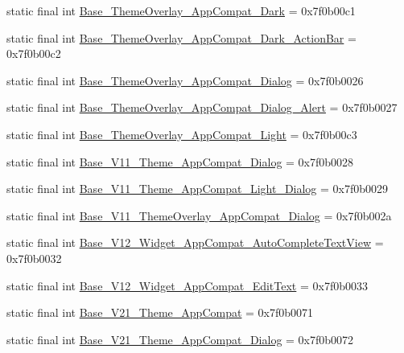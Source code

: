 \begin{CompactItemize}
static final int \hyperlink{classandroid_1_1support_1_1v7_1_1recyclerview_1_1_r_1_1style_ff69ab507a86cc9e91f1a405a536463d}{Base\_\-ThemeOverlay\_\-AppCompat\_\-Dark} = 0x7f0b00c1
\item 
static final int \hyperlink{classandroid_1_1support_1_1v7_1_1recyclerview_1_1_r_1_1style_516b93e3d4a6ddb150d06a687717e23c}{Base\_\-ThemeOverlay\_\-AppCompat\_\-Dark\_\-ActionBar} = 0x7f0b00c2
\item 
static final int \hyperlink{classandroid_1_1support_1_1v7_1_1recyclerview_1_1_r_1_1style_e09d7a0fd144cad835358474a1c50645}{Base\_\-ThemeOverlay\_\-AppCompat\_\-Dialog} = 0x7f0b0026
\item 
static final int \hyperlink{classandroid_1_1support_1_1v7_1_1recyclerview_1_1_r_1_1style_e2aaf58f5a0c47b619f72d6a9a72d1e9}{Base\_\-ThemeOverlay\_\-AppCompat\_\-Dialog\_\-Alert} = 0x7f0b0027
\item 
static final int \hyperlink{classandroid_1_1support_1_1v7_1_1recyclerview_1_1_r_1_1style_e5a5e01a3546756c36eadf0b0498929c}{Base\_\-ThemeOverlay\_\-AppCompat\_\-Light} = 0x7f0b00c3
\item 
static final int \hyperlink{classandroid_1_1support_1_1v7_1_1recyclerview_1_1_r_1_1style_81003bb3fdd3ed5c25e4a3146ad454bf}{Base\_\-V11\_\-Theme\_\-AppCompat\_\-Dialog} = 0x7f0b0028
\item 
static final int \hyperlink{classandroid_1_1support_1_1v7_1_1recyclerview_1_1_r_1_1style_d7ef20e388af9c35729f0f6595ba9f69}{Base\_\-V11\_\-Theme\_\-AppCompat\_\-Light\_\-Dialog} = 0x7f0b0029
\item 
static final int \hyperlink{classandroid_1_1support_1_1v7_1_1recyclerview_1_1_r_1_1style_8ed1a9dc86b13d3290bb4cea654475a4}{Base\_\-V11\_\-ThemeOverlay\_\-AppCompat\_\-Dialog} = 0x7f0b002a
\item 
static final int \hyperlink{classandroid_1_1support_1_1v7_1_1recyclerview_1_1_r_1_1style_3735c4a76154e3e531b87ef6da37f5e7}{Base\_\-V12\_\-Widget\_\-AppCompat\_\-AutoCompleteTextView} = 0x7f0b0032
\item 
static final int \hyperlink{classandroid_1_1support_1_1v7_1_1recyclerview_1_1_r_1_1style_4cdc3d0122d6803162cf2ab6b5f82c27}{Base\_\-V12\_\-Widget\_\-AppCompat\_\-EditText} = 0x7f0b0033
\item 
static final int \hyperlink{classandroid_1_1support_1_1v7_1_1recyclerview_1_1_r_1_1style_0bd394316c99c630244d7dac36a5e687}{Base\_\-V21\_\-Theme\_\-AppCompat} = 0x7f0b0071
\item 
static final int \hyperlink{classandroid_1_1support_1_1v7_1_1recyclerview_1_1_r_1_1style_0121eed494a8efc05d90499e335fb119}{Base\_\-V21\_\-Theme\_\-AppCompat\_\-Dialog} = 0x7f0b0072

\end{CompactItemize}
